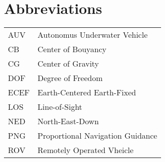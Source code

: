 \chapter{Abbreviations}
\begin{center}
\begin{tabular}{|l|l|}
\hline
AUV & Autonomus Underwater Vehicle \\
CB & Center of Bouyancy\\
CG & Center of Gravity \\
DOF & Degree of Freedom \\
ECEF & Earth-Centered Earth-Fixed \\
LOS & Line-of-Sight\\
NED & North-East-Down \\
PNG & Proportional Navigation Guidance \\
ROV & Remotely Operated Vheicle \\
\hline
\end{tabular}
\end{center}
